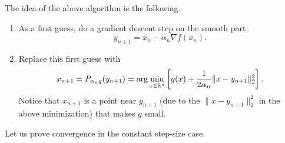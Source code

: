     The idea of the above algorithm is the following.
     \begin{enumerate}
         \item As a first guess, do a gradient descent step on the smooth part:
               \begin{equation}
                   y_{n+1} =x_n - \alpha_n\nabla f(x_n).
               \end{equation}
         \item Replace this first guess with
               \begin{equation}
                   x_{n+1} = P_{\alpha_n g}(y_{n+1}) = \arg\min_{x\in \mathbb{R}^{d}}\left[ g(x) + \frac{1}{2\alpha_n}\|x-y_{n+1}\|_2^2 \right].
               \end{equation}
               Notice that $x_{n+1}$ is a point near $y_{n+1}$ (due to the $\|x-y_{n+1}\|_2^2$ in the above minimization) that makes $g$ small.
     \end{enumerate}
 
     Let us prove convergence in the constant step-size case.
 
 
